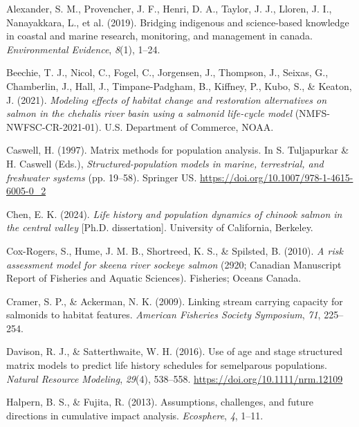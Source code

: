 \documentclass[
  letterpaper,
  DIV=11,
  numbers=noendperiod]{scrreprt}
\newlength{\cslhangindent}
\newenvironment{CSLReferences}[2] %
 {\begin{list}{}{%
  \setlength{\itemindent}{0pt}
  \setlength{\leftmargin}{0pt}
  \setlength{\parsep}{0pt}
  \ifodd #1
   \setlength{\leftmargin}{\cslhangindent}
   \setlength{\itemindent}{-1\cslhangindent}
  \fi
  \setlength{\itemsep}{#2\baselineskip}}}
 {\end{list}}
\begin{document}
\label{refs}
\begin{CSLReferences}{1}{0}
Alexander, S. M., Provencher, J. F., Henri, D. A., Taylor, J. J.,
Lloren, J. I., Nanayakkara, L., et al. (2019). Bridging indigenous and
science-based knowledge in coastal and marine research, monitoring, and
management in canada. \emph{Environmental Evidence}, \emph{8}(1), 1--24.

Beechie, T. J., Nicol, C., Fogel, C., Jorgensen, J., Thompson, J.,
Seixas, G., Chamberlin, J., Hall, J., Timpane-Padgham, B., Kiffney, P.,
Kubo, S., \& Keaton, J. (2021). \emph{Modeling effects of habitat change
and restoration alternatives on salmon in the chehalis river basin using
a salmonid life-cycle model} (NMFS-NWFSC-CR-2021-01). U.S. Department of
Commerce, NOAA.

Caswell, H. (1997). Matrix methods for population analysis. In S.
Tuljapurkar \& H. Caswell (Eds.), \emph{Structured-population models in
marine, terrestrial, and freshwater systems} (pp. 19--58). Springer US.
\url{https://doi.org/10.1007/978-1-4615-6005-0_2}

Chen, E. K. (2024). \emph{Life history and population dynamics of
chinook salmon in the central valley} {[}Ph.D. dissertation{]}.
University of California, Berkeley.

Cox-Rogers, S., Hume, J. M. B., Shortreed, K. S., \& Spilsted, B.
(2010). \emph{A risk assessment model for skeena river sockeye salmon}
(2920; Canadian Manuscript Report of Fisheries and Aquatic Sciences).
Fisheries; Oceans Canada.

Cramer, S. P., \& Ackerman, N. K. (2009). Linking stream carrying
capacity for salmonids to habitat features. \emph{American Fisheries
Society Symposium}, \emph{71}, 225--254.

Davison, R. J., \& Satterthwaite, W. H. (2016). Use of age and stage
structured matrix models to predict life history schedules for
semelparous populations. \emph{Natural Resource Modeling}, \emph{29}(4),
538--558. \url{https://doi.org/10.1111/nrm.12109}

Halpern, B. S., \& Fujita, R. (2013). Assumptions, challenges, and
future directions in cumulative impact analysis. \emph{Ecosphere},
\emph{4}, 1--11.


\end{CSLReferences}
\end{document}
